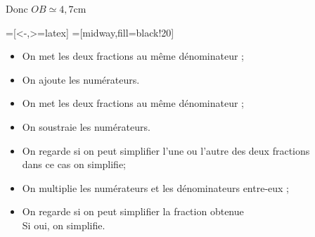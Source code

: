 Donc $OB \simeq 4,7$cm                                                                                  

\newpage


                 
                 
=[<-,>=latex]   
=[midway,fill=black!20]        
      
\begin{flushright}
\end{flushright}

\bigskip   

\renewcommand{\labelitemi}{\textbullet}
    
\begin{itemize}
\item On met les deux fractions au même dénominateur ;
\item On ajoute les numérateurs.
\end{itemize}

\bigskip   

\begin{itemize}
\item On met les deux fractions au même dénominateur ;
\item On soustraie les numérateurs.
\end{itemize}

\bigskip   

\begin{itemize}
\item On regarde si on peut simplifier l'une ou l'autre des deux fractions\\
      dans ce cas on simplifie;
\item On multiplie les numérateurs et les dénominateurs entre-eux ; 
\item On regarde si on peut simplifier la fraction obtenue\\
      Si oui, on simplifie.
\end{itemize}

